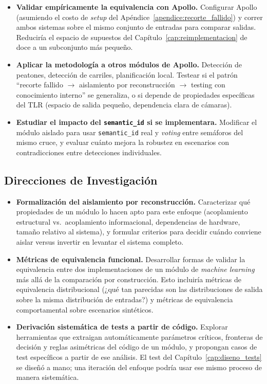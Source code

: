 \begin{itemize}
    \item \textbf{Validar empíricamente la equivalencia con Apollo.} Configurar Apollo (asumiendo el costo de \textit{setup} del Apéndice~\ref{apendice:recorte_fallido}) y correr ambos sistemas sobre el mismo conjunto de entradas para comparar salidas. Reduciría el espacio de supuestos del Capítulo~\ref{cap:reimplementacion} de doce a un subconjunto más pequeño.

    \item \textbf{Aplicar la metodología a otros módulos de Apollo.} Detección de peatones, detección de carriles, planificación local. Testear si el patrón ``recorte fallido $\to$ aislamiento por reconstrucción $\to$ testing con conocimiento interno'' se generaliza, o si depende de propiedades específicas del TLR (espacio de salida pequeño, dependencia clara de cámaras).

    \item \textbf{Estudiar el impacto del \texttt{semantic\_id} si se implementara.} Modificar el módulo aislado para usar \texttt{semantic\_id} real y \textit{voting} entre semáforos del mismo cruce, y evaluar cuánto mejora la robustez en escenarios con contradicciones entre detecciones individuales.
\end{itemize}

\subsection{Direcciones de Investigación}

\begin{itemize}
    \item \textbf{Formalización del aislamiento por reconstrucción.} Caracterizar qué propiedades de un módulo lo hacen apto para este enfoque (acoplamiento estructural vs.\ acoplamiento informacional, dependencias de hardware, tamaño relativo al sistema), y formular criterios para decidir cuándo conviene aislar versus invertir en levantar el sistema completo.

    \item \textbf{Métricas de equivalencia funcional.} Desarrollar formas de validar la equivalencia entre dos implementaciones de un módulo de \textit{machine learning} más allá de la comparación por construcción. Esto incluiría métricas de equivalencia distribucional (¿qué tan parecidas son las distribuciones de salida sobre la misma distribución de entradas?) y métricas de equivalencia comportamental sobre escenarios sintéticos.

    \item \textbf{Derivación sistemática de tests a partir de código.} Explorar herramientas que extraigan automáticamente parámetros críticos, fronteras de decisión y reglas asimétricas del código de un módulo, y propongan casos de test específicos a partir de ese análisis. El test del Capítulo~\ref{cap:diseno_tests} se diseñó a mano; una iteración del enfoque podría usar ese mismo proceso de manera sistemática.
\end{itemize}

